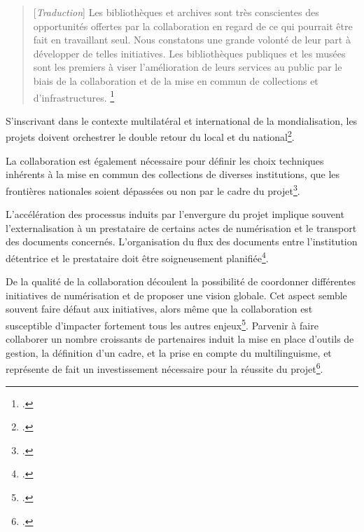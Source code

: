 \begin{quotation}
[\textit{Traduction}]
Les bibliothèques et archives sont très conscientes des opportunités offertes par la collaboration en regard de ce qui pourrait être fait en travaillant seul. Nous constatons une grande volonté de leur part à développer de telles initiatives. Les bibliothèques publiques et les musées sont les premiers à viser l'amélioration de leurs services au public par le biais de la collaboration et de la mise en commun de collections et d'infrastructures.
\footnote{\cite[p.23]{coutts_stepping_2017}.} 
\end{quotation}

S'inscrivant dans le contexte multilatéral et international de la mondialisation, les projets doivent  orchestrer le double retour du local et du national\footcite[p.175]{dufrene_numerisation_2013}.

La collaboration est également nécessaire pour définir les choix techniques inhérents à la mise en commun des collections de diverses institutions, que les frontières nationales soient dépassées ou non par le cadre du  projet\footcite{moatti_bibliotheque_2012}. 

L'accélération des processus induits par l'envergure du projet implique souvent l'externalisation à un prestataire de certains actes de numérisation et le transport des documents concernés. L'organisation du flux des documents entre l'institution détentrice et le prestataire doit être soigneusement planifiée\footcite{ministere_de_la_culture_et_de_la_communication_:_direction_des_archives_de_france_ecrire_nodate}.

De la qualité de la collaboration découlent la possibilité de coordonner différentes initiatives de numérisation et de proposer une vision globale. Cet aspect semble souvent faire défaut aux initiatives, alors même que la collaboration est susceptible d'impacter fortement tous les autres enjeux\footcite{coutts_stepping_2017}. Parvenir à faire collaborer un nombre croissants de partenaires induit la mise en place d'outils de gestion, la définition d'un cadre, et la prise en compte du multilinguisme, et représente de fait un investissement nécessaire pour la réussite du projet\footcite{eschenfelder_nine_2019}.

